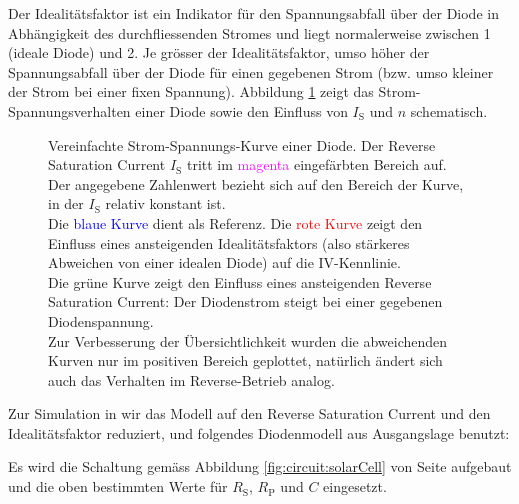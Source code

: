 Der Idealit\"atsfaktor ist ein Indikator  f\"ur den Spannungsabfall \"uber der
Diode in  Abh\"angigkeit des durchfliessenden Stromes  und liegt normalerweise
zwischen  1  (ideale  Diode)   und  2. Je  gr\"osser  der  Idealit\"atsfaktor,
umso  h\"oher  der Spannungsabfall  \"uber  der  Diode f\"ur  einen  gegebenen
Strom  (bzw.  umso kleiner  der  Strom  bei einer  fixen  Spannung). Abbildung
\ref{fig:diodeVI:IS} zeigt das Strom-Spannungsverhalten  einer Diode sowie den
Einfluss von $I_{\mathrm{S}}$ und $n$ schematisch.

\begin{figure}[h!tb]
    
    \caption{%
        Vereinfachte Strom-Spannungs-Kurve einer Diode. Der Reverse Saturation
        Current   $I_{\mathrm{S}}$   tritt   im   \textcolor{magenta}{magenta}
        eingef\"arbten Bereich auf. Der angegebene Zahlenwert bezieht sich auf
        den  Bereich  der  Kurve,  in der  $I_{\mathrm{S}}$  relativ  konstant
        ist.\protect\\
        Die    \textcolor{blue}{blaue   Kurve}    dient   als    Referenz. Die
        \textcolor{red}{rote  Kurve}  zeigt  den Einfluss  eines  ansteigenden
        Idealit\"atsfaktors  (also  st\"arkeres  Abweichen von  einer  idealen
        Diode) auf die IV-Kennlinie.\protect\\
        Die \textcolor{green!50!black}{gr\"une Kurve} zeigt den Einfluss eines
        ansteigenden  Reverse Saturation  Current: Der Diodenstrom  steigt bei
        einer gegebenen Diodenspannung.\protect\\
        Zur  Verbesserung  der  \"Ubersichtlichkeit  wurden  die  abweichenden
        Kurven nur  im positiven Bereich geplottet,  nat\"urlich \"andert sich
        auch das Verhalten im Reverse-Betrieb analog.%
    }
    \label{fig:diodeVI:IS}
\end{figure}


Zur Simulation  in   wir das Modell  auf den  Reverse Saturation
Current und  den Idealit\"atsfaktor reduziert, und  folgendes Diodenmodell aus
Ausgangslage benutzt:

\begin{center}
\end{center}

Es wird die Schaltung gem\"ass Abbildung \ref{fig:circuit:solarCell} von Seite
\pageref{fig:circuit:solarCell} aufgebaut und die  oben bestimmten Werte f\"ur
$R_{\mathrm{S}}$, $R_{\mathrm{P}}$ und $C$ eingesetzt.



